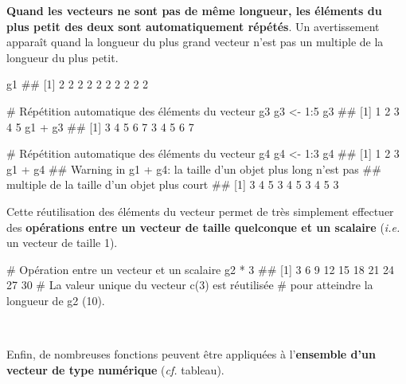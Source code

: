 \documentclass[12pt,twosided, notitlepage]{book}
\newenvironment{Shaded}{}{}
\newcommand{\DecValTok}[1]{{#1}}
\newcommand{\StringTok}[1]{\textcolor[rgb]{0.00,0.50,0.50}{{#1}}}
\newcommand{\CommentTok}[1]{\textcolor[rgb]{0.00,0.50,0.00}{{#1}}}
\newcommand{\NormalTok}[1]{{#1}}
\renewenvironment{Shaded}{\begin{snugshade}}{\end{snugshade}}
\begin{document}
\textbf{Quand les vecteurs ne sont pas de même longueur, les éléments du
plus petit des deux sont automatiquement répétés}. Un avertissement
apparaît quand la longueur du plus grand vecteur n'est pas un multiple
de la longueur du plus petit.

\begin{Shaded}
\begin{Highlighting}[]
\NormalTok{g1}
  \NormalTok{##  [1] 2 2 2 2 2 2 2 2 2 2}

\CommentTok{# Répétition automatique des éléments du vecteur g3}
\NormalTok{g3 <-}\StringTok{ }\DecValTok{1}\NormalTok{:}\DecValTok{5}
\NormalTok{g3}
  \NormalTok{## [1] 1 2 3 4 5}
\NormalTok{g1 +}\StringTok{ }\NormalTok{g3}
  \NormalTok{##  [1] 3 4 5 6 7 3 4 5 6 7}

\CommentTok{# Répétition automatique des éléments du vecteur g4}
\NormalTok{g4 <-}\StringTok{ }\DecValTok{1}\NormalTok{:}\DecValTok{3}
\NormalTok{g4}
  \NormalTok{## [1] 1 2 3}
\NormalTok{g1 +}\StringTok{ }\NormalTok{g4}
  \NormalTok{## Warning in g1 + g4: la taille d'un objet plus long n'est pas}
  \NormalTok{## multiple de la taille d'un objet plus court}
  \NormalTok{##  [1] 3 4 5 3 4 5 3 4 5 3}
\end{Highlighting}
\end{Shaded}

Cette réutilisation des éléments du vecteur permet de très simplement
effectuer des \textbf{opérations entre un vecteur de taille quelconque
et un scalaire} (\emph{i.e.} un vecteur de taille 1).

\begin{Shaded}
\begin{Highlighting}[]
\CommentTok{# Opération entre un vecteur et un scalaire}
\NormalTok{g2 *}\StringTok{ }\DecValTok{3}
  \NormalTok{##  [1]  3  6  9 12 15 18 21 24 27 30}
\CommentTok{# La valeur unique du vecteur c(3) est réutilisée}
\CommentTok{# pour atteindre la longueur de g2 (10). }
\end{Highlighting}
\end{Shaded}

~

Enfin, de nombreuses fonctions peuvent être appliquées à
l'\textbf{ensemble d'un vecteur de type numérique} (\emph{cf.} tableau).
\end{document}
